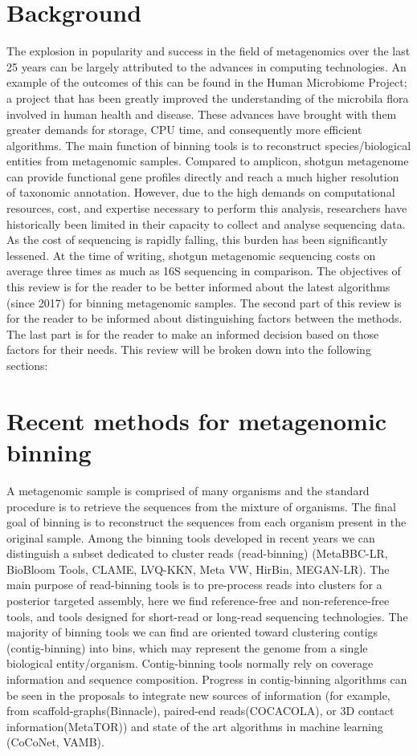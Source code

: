 \documentclass{article}
\begin{document}
\section*{Background}
The explosion in popularity and success in the field of metagenomics over the last 25 years can be largely attributed to the advances in computing technologies.
An example of the outcomes of this can be found in the Human Microbiome Project; a project that has been greatly improved the understanding of the microbila flora involved in human health and disease.
These advances have brought with them greater demands for storage, CPU time, and consequently more efficient algorithms.
The main function of binning tools is to reconstruct species/biological entities from metagenomic samples.  
Compared to amplicon, shotgun metagenome can provide functional gene profiles directly and reach a much higher resolution of taxonomic annotation.
However, due to the high demands on computational resources, cost, and expertise necessary to perform this analysis, researchers have historically been limited in their capacity to collect and analyse sequencing data.
As the cost of sequencing is rapidly falling, this burden has been significantly lessened.
At the time of writing, shotgun metagenomic sequencing costs on average three times as much as 16S sequencing in comparison.
The objectives of this review is for the reader to be better informed about the latest algorithms (since 2017) for binning metagenomic samples.
The second part of this review is for the reader to be informed about distinguishing factors between the methods.
The last part is for the reader to make an informed decision based on those factors for their needs.
This review will be broken down into the following sections:

\section*{Recent methods for metagenomic binning}
A metagenomic sample is comprised of many organisms and the standard procedure is to retrieve the sequences from the mixture of organisms.
The final goal of binning is to reconstruct the sequences from each organism present in the original sample.
Among the binning tools developed in recent years we can distinguish a subset dedicated to cluster reads (read-binning) (MetaBBC-LR, BioBloom Tools, CLAME, LVQ-KKN, Meta VW, HirBin, MEGAN-LR).
The main purpose of read-binning tools is to pre-process reads into clusters for a posterior targeted assembly, here we find reference-free and non-reference-free tools, and tools designed for short-read or long-read sequencing technologies.
The majority of binning tools we can find are oriented toward clustering contigs (contig-binning) into bins, which may represent the genome from a single biological entity/organism.
Contig-binning tools normally rely on coverage information and sequence composition.
Progress in contig-binning algorithms can be seen in the proposals to integrate new sources of information (for example, from scaffold-graphs(Binnacle), paired-end reads(COCACOLA), or 3D contact information(MetaTOR)) and state of the art algorithms in machine learning (CoCoNet, \gls{VAMB}).
\end{document}
